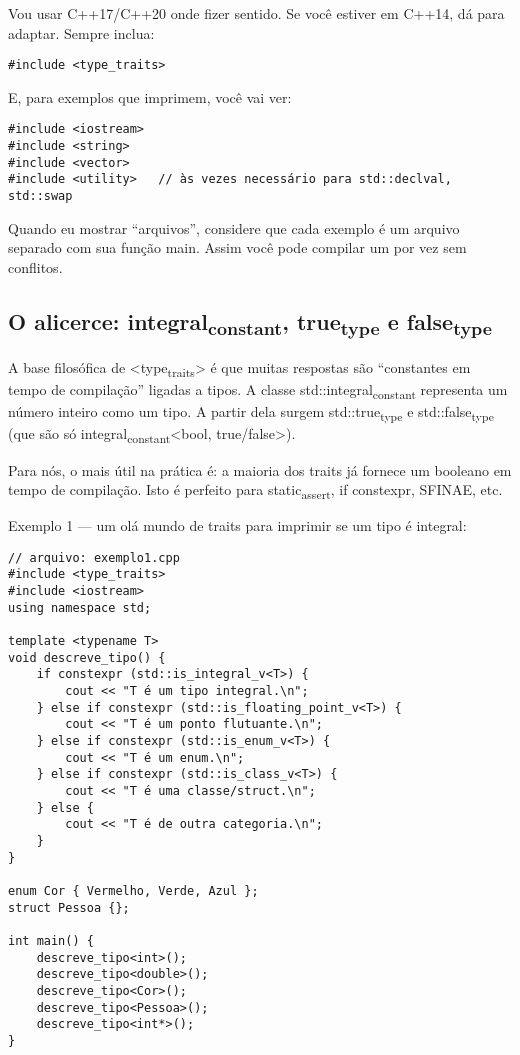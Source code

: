 \documentclass[11pt]{article}
\begin{document}
Vou usar C++17/C++20 onde fizer sentido. Se você estiver em C++14, dá para adaptar. Sempre inclua:

\begin{verbatim}
#include <type_traits>
\end{verbatim}

E, para exemplos que imprimem, você vai ver:

\begin{verbatim}
#include <iostream>
#include <string>
#include <vector>
#include <utility>   // às vezes necessário para std::declval, std::swap
\end{verbatim}

Quando eu mostrar “arquivos”, considere que cada exemplo é um arquivo separado com sua função main. Assim você pode compilar um por vez sem conflitos.
\subsection{O alicerce: integral\textsubscript{constant}, true\textsubscript{type} e false\textsubscript{type}}
\label{sec:org6c42c87}

A base filosófica de <type\textsubscript{traits}> é que muitas respostas são “constantes em tempo de compilação” ligadas a tipos. A classe std::integral\textsubscript{constant} representa um número inteiro como um tipo. A partir dela surgem std::true\textsubscript{type} e std::false\textsubscript{type} (que são só integral\textsubscript{constant}<bool, true/false>).

Para nós, o mais útil na prática é: a maioria dos traits já fornece um booleano em tempo de compilação. Isto é perfeito para static\textsubscript{assert}, if constexpr, SFINAE, etc.

Exemplo 1 — um olá mundo de traits para imprimir se um tipo é integral:
\begin{verbatim}
// arquivo: exemplo1.cpp
#include <type_traits>
#include <iostream>
using namespace std;

template <typename T>
void descreve_tipo() {
    if constexpr (std::is_integral_v<T>) {
        cout << "T é um tipo integral.\n";
    } else if constexpr (std::is_floating_point_v<T>) {
        cout << "T é um ponto flutuante.\n";
    } else if constexpr (std::is_enum_v<T>) {
        cout << "T é um enum.\n";
    } else if constexpr (std::is_class_v<T>) {
        cout << "T é uma classe/struct.\n";
    } else {
        cout << "T é de outra categoria.\n";
    }
}

enum Cor { Vermelho, Verde, Azul };
struct Pessoa {};

int main() {
    descreve_tipo<int>();
    descreve_tipo<double>();
    descreve_tipo<Cor>();
    descreve_tipo<Pessoa>();
    descreve_tipo<int*>();
}
\end{verbatim}
\end{document}
